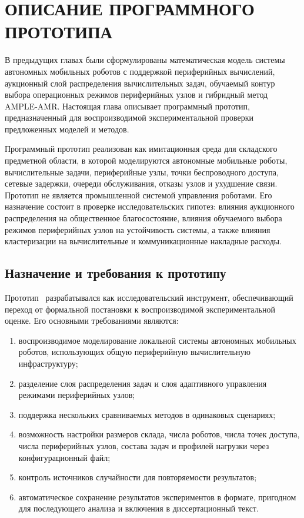 \chapter{ОПИСАНИЕ ПРОГРАММНОГО ПРОТОТИПА}\label{ch:ch7}

В предыдущих главах были сформулированы математическая модель системы автономных мобильных роботов с поддержкой периферийных вычислений, аукционный слой распределения вычислительных задач, обучаемый контур выбора операционных режимов периферийных узлов и гибридный метод AMPLE-AMR. Настоящая глава описывает программный прототип, предназначенный для воспроизводимой экспериментальной проверки предложенных моделей и методов.

Программный прототип реализован как имитационная среда для складского предметной области, в которой моделируются автономные мобильные роботы, вычислительные задачи, периферийные узлы, точки беспроводного доступа, сетевые задержки, очереди обслуживания, отказы узлов и ухудшение связи. Прототип не является промышленной системой управления роботами. Его назначение состоит в проверке исследовательских гипотез: влияния аукционного распределения на общественное благосостояние, влияния обучаемого выбора режимов периферийных узлов на устойчивость системы, а также влияния кластеризации на вычислительные и коммуникационные накладные расходы.

\section{Назначение и требования к прототипу}

Прототип~\cite{Tereschenko2026AMPLEAMRPrototype} разрабатывался как исследовательский инструмент, обеспечивающий переход от формальной постановки к воспроизводимой экспериментальной оценке. Его основными требованиями являются:
\begin{enumerate}
    \item воспроизводимое моделирование локальной системы автономных мобильных роботов, использующих общую периферийную вычислительную инфраструктуру;
    \item разделение слоя распределения задач и слоя адаптивного управления режимами периферийных узлов;
    \item поддержка нескольких сравниваемых методов в одинаковых сценариях;
    \item возможность настройки размеров склада, числа роботов, числа точек доступа, числа периферийных узлов, состава задач и профилей нагрузки через конфигурационный файл;
    \item контроль источников случайности для повторяемости результатов;
    \item автоматическое сохранение результатов экспериментов в формате, пригодном для последующего анализа и включения в диссертационный текст.
\end{enumerate}

